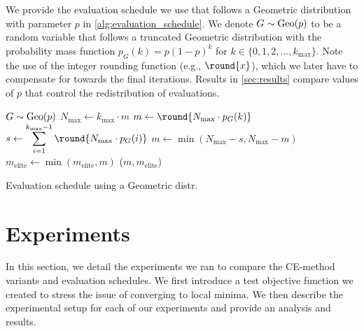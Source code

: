 We provide the evaluation schedule we use that follows a Geometric distribution with parameter $p$ in \cref{alg:evaluation_schedule}.
We denote $G \sim \operatorname{Geo}(p)$ to be a random variable that follows a truncated Geometric distribution with the probability mass function $p_G(k) = p(1 - p)^k$ for $k \in \{0, 1, 2, \ldots, k_\text{max}\}$. %
Note the use of the integer rounding function (e.g., $\round{x}$), which we later have to compensate for towards the final iterations.
Results in \cref{sec:results} compare values of $p$ that control the redistribution of evaluations.


\begin{algorithm}[ht]
  \begin{algorithmic}
    \State $G \sim \operatorname{Geo}(p)$
    \State $N_\text{max} \leftarrow k_\text{max} \cdot m$
    \State $m \leftarrow \round{N_\text{max} \cdot p_G(k)}$
        \State $s \leftarrow \displaystyle\sum_{i=1}^{k_\text{max}-1} \round{N_\text{max} \cdot p_G(i)}$
        \State $m \leftarrow \min(N_\text{max} - s, N_\text{max} - m)$
    \EndIf
    \State $m_\text{elite} \leftarrow \min(m_\text{elite}, m)$
    \State \Return ($m, m_\text{elite}$) 
  \EndFunction
  \end{algorithmic}
  \caption{\label{alg:evaluation_schedule} Evaluation schedule using a Geometric distr.}
\end{algorithm}


\section{Experiments} \label{sec:experiments}
In this section, we detail the experiments we ran to compare the CE-method variants and evaluation schedules.
We first introduce a test objective function we created to stress the issue of converging to local minima. 
We then describe the experimental setup for each of our experiments and provide an analysis and results.



